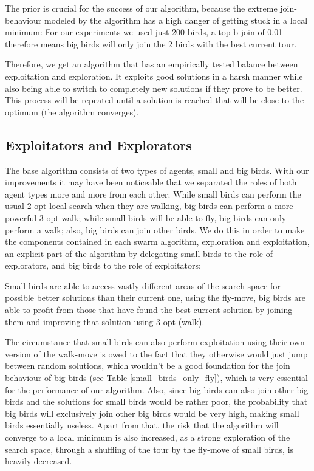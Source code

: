The prior is crucial for the success of our algorithm, because the extreme join-behaviour modeled by the algorithm has a high danger of getting stuck in a local minimum: For our experiments we used just 200 birds, a top-b join of 0.01 therefore means big birds will only join the 2 birds with the best current tour.

Therefore, we get an algorithm that has an empirically tested balance between exploitation and exploration. It exploits good solutions in a harsh manner while also being able to switch to completely new solutions if they prove to be better.
This process will be repeated until a solution is reached that will be close to the optimum (the algorithm converges).

\subsection{Exploitators and Explorators}
The base algorithm consists of two types of agents, small and big birds. With our improvements it may have been noticeable that we separated the roles of both agent types more and more from each other: While small birds can perform the usual 2-opt local search when they are walking, big birds can perform a more powerful 3-opt walk; while small birds will be able to fly, big birds can only perform a walk; also, big birds can join other birds.
We do this in order to make the components contained in each swarm algorithm, exploration and exploitation, an explicit part of the algorithm by delegating small birds to the role of explorators, and big birds to the role of exploitators:

Small birds are able to access vastly different areas of the search space for possible better solutions than their current one, using the fly-move, big birds are able to profit from those that have found the best current solution by joining them and improving that solution using 3-opt (walk).


The circumstance that small birds can also perform exploitation using their own version of the walk-move is owed to the fact that they otherwise would just jump between random solutions, which wouldn’t be a good foundation for the join behaviour of big birds (see Table \ref{small_birds_only_fly}), which is very essential for the performance of our algorithm. Also, since big birds can also join other big birds and the solutions for small birds would be rather poor, the probability that big birds will exclusively join other big birds would be very high, making small birds essentially useless. Apart from that, the risk that the algorithm will converge to a local minimum is also increased, as a strong exploration of the search space, through a shuffling of the tour by the fly-move of small birds, is heavily decreased.

